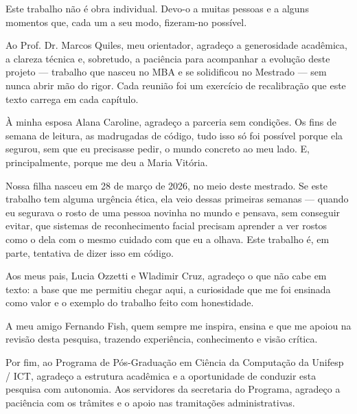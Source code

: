 Este trabalho não é obra individual. Devo-o a muitas pessoas e a alguns momentos que, cada um a seu modo, fizeram-no possível.

Ao Prof. Dr. Marcos Quiles, meu orientador, agradeço a generosidade acadêmica, a clareza técnica e, sobretudo, a paciência para acompanhar a evolução deste projeto — trabalho que nasceu no MBA e se solidificou no Mestrado — sem nunca abrir mão do rigor. Cada reunião foi um exercício de recalibração que este texto carrega em cada capítulo.

À minha esposa Alana Caroline, agradeço a parceria sem condições. Os fins de semana de leitura, as madrugadas de código, tudo isso só foi possível porque ela segurou, sem que eu precisasse pedir, o mundo concreto ao meu lado. E, principalmente, porque me deu a Maria Vitória.

Nossa filha nasceu em 28 de março de 2026, no meio deste mestrado. Se este trabalho tem alguma urgência ética, ela veio dessas primeiras semanas — quando eu segurava o rosto de uma pessoa novinha no mundo e pensava, sem conseguir evitar, que sistemas de reconhecimento facial precisam aprender a ver rostos como o dela com o mesmo cuidado com que eu a olhava. Este trabalho é, em parte, tentativa de dizer isso em código.

Aos meus pais, Lucia Ozzetti e Wladimir Cruz, agradeço o que não cabe em texto: a base que me permitiu chegar aqui, a curiosidade que me foi ensinada como valor e o exemplo do trabalho feito com honestidade.

A meu amigo Fernando Fish, quem sempre me inspira, ensina e que me apoiou na revisão desta pesquisa, trazendo experiência, conhecimento e visão crítica.

Por fim, ao Programa de Pós-Graduação em Ciência da Computação da Unifesp / ICT, agradeço a estrutura acadêmica e a oportunidade de conduzir esta pesquisa com autonomia. Aos servidores da secretaria do
Programa, agradeço a paciência com os trâmites e o apoio nas tramitações administrativas.